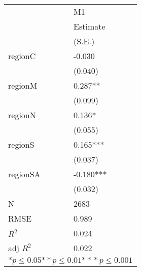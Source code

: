 \begin{tabular}{*{2}{l}}
\hline
                  & M1   \tabularnewline
                   &Estimate \tabularnewline
                 &(S.E.) \tabularnewline
 \hline
 \hline
   regionC         &-0.030 \tabularnewline
                 &(0.040)  \tabularnewline
   regionM         &0.287** \tabularnewline
                 &(0.099)  \tabularnewline
   regionN         &0.136* \tabularnewline
                 &(0.055)  \tabularnewline
   regionS         &0.165*** \tabularnewline
                 &(0.037)  \tabularnewline
   regionSA        &-0.180*** \tabularnewline
                 &(0.032)  \tabularnewline
 \hline
 N                 &2683       \tabularnewline
 RMSE             &0.989   \tabularnewline
 $R^2$             &0.024   \tabularnewline
 adj $R^2$         &0.022   \tabularnewline
 \hline
\hline
 
 \multicolumn{2}{c}{${*  p}\le 0.05$${*\!\!*  p}\le 0.01$${*\!\!*\!\!*  p}\le 0.001$}\tabularnewline
 \end{tabular}